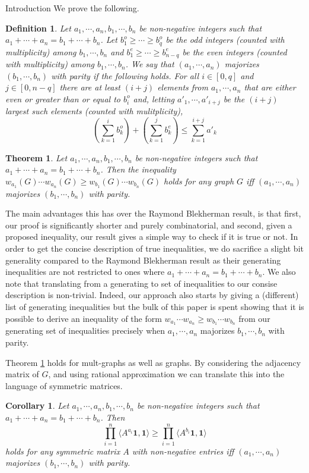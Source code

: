 \documentclass[11pt,a4paper]{article}
\newcounter{foo}
\newtheorem{theorem}{Theorem}
\newtheorem{corollary}[subsection]{Corollary}
\newtheorem{definition}[foo]{Definition}
\begin{document}
\begin{section}{Introduction}
We prove the following.

\begin{definition} Let $a_1, \cdots, a_n, b_1, \cdots, b_n$ be non-negative integers such that $a_1 + \cdots + a_n = b_1 + \cdots + b_n$. Let $b^o_1 \geq \cdots \geq b^o_q$ be the odd integers (counted with multiplicity) among $b_1, \cdots, b_n$ and $b^e_1 \geq \cdots \geq b^e_{n - q}$ be the even integers (counted with multiplicity) among $b_1, \cdots, b_n$. We say that $(a_1, \cdots, a_n)$ \textit{majorizes} $(b_1, \cdots, b_n)$ \textit{with parity} if the following holds. For all $i \in [0, q]$ and $j \in [0, n - q]$ there are at least $(i + j)$ elements from $a_1, \cdots, a_n$ that are either even or greater than or equal to $b^o_i$ and, letting $a'_1, \cdots, a'_{i + j}$ be the $(i + j)$ largest such elements (counted with mulitplicity),
\[
\left ( \sum_{k = 1}^i b^o_k \right ) + \left ( \sum_{k = 1}^j b^e_k \right ) \leq \sum_{k = 1}^{i + j} a'_{k}
\]
\end{definition}
\begin{theorem} \label{main}
Let $a_1, \cdots, a_n, b_1, \cdots, b_n$ be non-negative integers such that $a_1 +\cdots + a_n = b_1 +\cdots + b_n$. Then the inequality $w_{a_1}(G) \cdots w_{a_n}(G) \geq w_{b_1}(G) \cdots w_{b_n}(G)$ holds for any graph $G$ iff $(a_1, \cdots, a_n)$ majorizes $(b_1, \cdots, b_n)$ with parity.
\end{theorem}
The main advantages this has over the Raymond Blekherman \cite{BR2} result, is that first, our proof is significantly shorter and purely combinatorial, and second, given a proposed inequality, our result gives a simple way to check if it is true or not. In order to get the concise description of true inequalities, we do sacrifice a slight bit generality compared to the Raymond Blekherman result as their generating inequalities are not restricted to ones where $a_1 + \cdots + a_n = b_1 + \cdots + b_n$. We also note that translating from a generating to set of inequalities to our consise description is non-trivial. Indeed, our approach also starts by giving a (different) list of generating inequalities but the bulk of this paper is spent showing that it is possible to derive an inequality of the form $w_{a_1} \cdots w_{a_n} \geq w_{b_1} \cdots w_{b_n}$ from our generating set of inequalities precisely when $a_1, \cdots, a_n$ majorizes $b_1, \cdots, b_n$ with parity.

\medskip

Theorem \ref{main} holds for mult-graphs as well as graphs. By considering the adjacency matrix of $G$, and using rational approximation we can translate this into the language of symmetric matrices.
\begin{corollary} Let $a_1, \cdots, a_n, b_1, \cdots, b_n$ be non-negative integers such that $a_1 + \cdots + a_n = b_1 +\cdots + b_n$. Then
\[
\prod_{i = 1}^n \langle A^{a_i} \boldsymbol{1}, \boldsymbol{1} \rangle \geq \prod_{i = 1}^n \langle A^{b_i} \boldsymbol{1}, \boldsymbol{1} \rangle
\]
holds for any symmetric matrix $A$ with non-negative entries iff $(a_1, \cdots, a_n)$ majorizes $(b_1, \cdots, b_n)$ with parity. 
\end{corollary}


\end{section}
\end{document}
